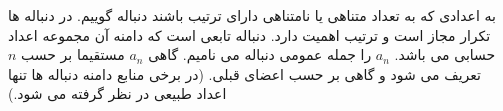 \p
به اعدادی که به تعداد متناهی یا نامتناهی دارای ترتیب باشند دنباله گوییم. در دنباله ها تکرار مجاز است و ترتیب اهمیت دارد.
دنباله تابعی است که دامنه آن مجموعه اعداد حسابی می باشد.
\p
$a_n$
را جمله عمومی دنباله می نامیم. گاهی
$a_n$
مستقیما بر حسب
$n$
تعریف می شود و گاهی بر حسب اعضای قبلی.
\p
(در برخی منابع دامنه دنباله ها تنها اعداد طبیعی در نظر گرفته می شود.)




